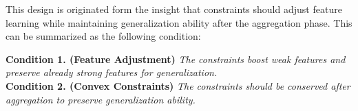 \documentclass{article}
\theoremstyle{plain}
\theoremstyle{definition}
\theoremstyle{remark}
\begin{document}







This design is originated form the insight that constraints should adjust feature learning while maintaining generalization ability after the aggregation phase. This can be summarized as the following condition:

\textbf{Condition 1. (Feature Adjustment)} \textit{The constraints boost weak features and preserve already strong features for generalization.}\\  
\textbf{Condition 2. (Convex Constraints)} \textit{The constraints should be conserved after aggregation to preserve generalization ability.}
\end{document}
